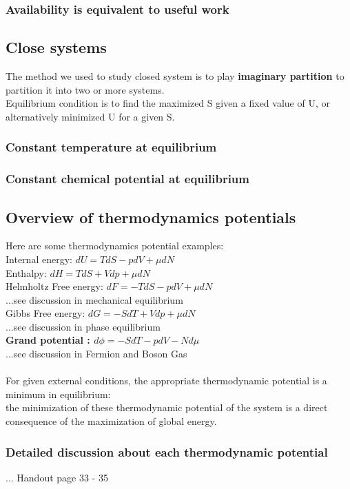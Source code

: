 \documentclass[12pt,a4paper]{article}
\begin{document}
    \subsubsection{Availability is equivalent to useful work}

    \subsection{Close systems}
    The method we used to study closed system is to play \textbf{imaginary partition}
    to partition it into two or more systems.\\
    Equilibrium condition is to find the maximized S given a fixed value of U, or alternatively
    minimized U for a given S.
    \subsubsection{Constant temperature at equilibrium}
    \subsubsection{Constant chemical potential at equilibrium}
    \subsection{Overview of thermodynamics potentials}
    Here are some thermodynamics potential examples:\\
    Internal energy: $dU = TdS - pdV+\mu dN$\\
    Enthalpy: $dH = TdS + Vdp +\mu dN$\\
    Helmholtz Free energy: $dF = -TdS -pdV + \mu dN$\\ ...see discussion in mechanical equilibrium \\
    Gibbs Free energy: $dG = -SdT + Vdp +\mu dN$\\ ...see discussion in phase equilibrium \\
    \textbf{Grand potential : $d\phi = -SdT -pdV - Nd\mu$}\\ ...see discussion in Fermion and Boson Gas \\
    \\
    For given external conditions, the appropriate thermodynamic potential is a minimum in equilibrium:\\
    the minimization of these thermodynamic potential of the system is a direct consequence of the maximization of global energy.
    \subsubsection{Detailed discussion about each thermodynamic potential}
    ... Handout page 33 - 35
\end{document}
